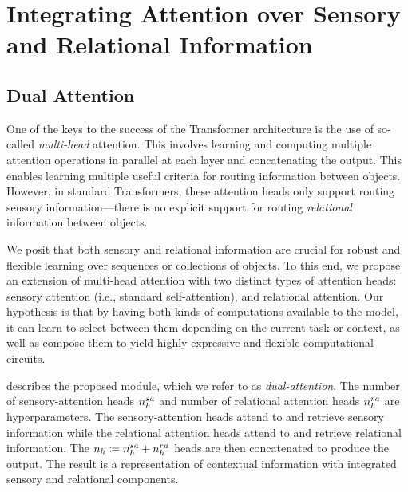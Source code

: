 \section{Integrating Attention over Sensory and Relational Information}

\subsection{Dual Attention}

One of the keys to the success of the Transformer architecture is the use of so-called \textit{multi-head} attention. This involves learning and computing multiple attention operations in parallel at each layer and concatenating the output. This enables learning multiple useful criteria for routing information between objects. However, in standard Transformers, these attention heads only support routing sensory information---there is no explicit support for routing \textit{relational} information between objects.

We posit that both sensory and relational information are crucial for robust and flexible learning over sequences or collections of objects. To this end, we propose an extension of multi-head attention with two distinct types of attention heads: sensory attention (i.e., standard self-attention), and relational attention.  Our hypothesis is that by having both kinds of computations available to the model, it can learn to select between them depending on the current task or context, as well as compose them to yield highly-expressive and flexible computational circuits.


 describes the proposed module, which we refer to as \textit{dual-attention}. The number of sensory-attention heads $n_h^{sa}$ and number of relational attention heads $n_h^{ra}$ are hyperparameters. The sensory-attention heads attend to and retrieve sensory information while the relational attention heads attend to and retrieve relational information. The $n_h \coloneq n_h^{sa} + n_h^{ra}$ heads are then concatenated to produce the output. The result is a representation of contextual information with integrated sensory and relational components.

